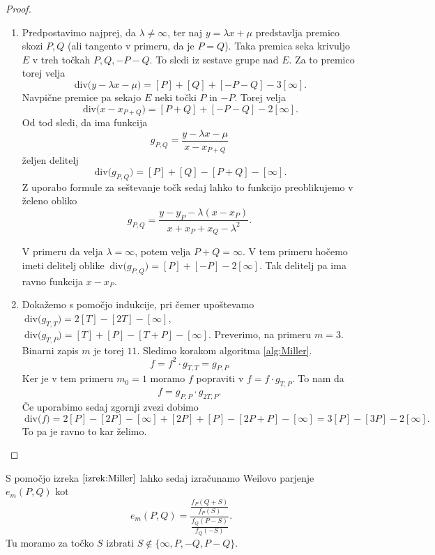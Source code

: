 \documentclass[12pt,a4paper,twoside]{article}
\theoremstyle{definition} %
\theoremstyle{plain} %
\numberwithin{equation}{section}  %
\newcommand{\Div}[1]{\ \text{div(}{#1}\text{)}}
\begin{document}
\begin{proof}~

\begin{enumerate}
\item Predpostavimo najprej, da $\lambda \neq \infty$, ter naj $y = \lambda x + \mu$ predstavlja premico skozi $P,Q$ (ali tangento v primeru, da je $P=Q$). Taka premica seka krivuljo $E$ v treh točkah $P,Q,-P-Q$. To sledi iz sestave grupe nad $E$. Za to premico torej velja
$$\Div{y-\lambda x - \mu} = [P] + [Q] + [-P-Q] - 3[\infty].$$
Navpične premice pa sekajo $E$ neki točki $P$ in $-P$. Torej velja
$$\Div{x-x_{P+Q}} = [P+Q] + [-P-Q] - 2[\infty].$$
Od tod sledi, da ima funkcija
$$g_{P,Q} =\frac{y-\lambda x - \mu}{x-x_{P+Q}}$$
željen delitelj
$$\Div{g_{P,Q}} = [P] + [Q] - [P+Q] - [\infty].$$
Z uporabo formule za seštevanje točk sedaj lahko to funkcijo preoblikujemo v želeno obliko
$$g_{P,Q} = \frac{y-y_P-\lambda(x-x_P)}{x+x_P+x_Q-\lambda^2} .$$

V primeru da velja $\lambda = \infty$, potem velja $P+Q = \infty$. V tem primeru hočemo imeti delitelj oblike $\Div{g_{P,Q}} = [P] + [-P] - 2[\infty]$. Tak delitelj pa ima ravno funkcija $x-x_P$.

\item Dokažemo s pomočjo indukcije, pri čemer upoštevamo $\Div{g_{T,T}} = 2[T]-[2T]-[\infty]$, $\Div{g_{T,P}} = [T]+[P]-[T+P]-[\infty]$.
Preverimo, na primeru $m = 3$. Binarni zapis $m$ je torej $11$. Sledimo korakom algoritma \ref{alg:Miller}.
$$f = f^2 \cdot g_{T,T} = g_{P,P}$$
Ker je v tem primeru $m_0 = 1$ moramo $f$ popraviti v $f = f \cdot g_{T,P}$. To nam da
$$f = g_{P,P} \cdot g_{2T,P}.$$
Če uporabimo sedaj zgornji zvezi dobimo
$$\Div{f} = 2[P] - [2P] - [\infty] + [2P] + [P] - [2P+P] - [\infty] = 3[P] - [3P]-2[\infty].$$
To pa je ravno to kar želimo.

\end{enumerate}

\end{proof}

S pomočjo izreka $\ref{izrek:Miller}$ lahko sedaj izračunamo Weilovo parjenje $e_m(P,Q)$ kot
$$e_m(P,Q) = \frac{\frac{f_P(Q+S)}{f_P(S)}}{\frac{f_Q(P-S)}{f_Q(-S)}} .$$
Tu moramo za točko $S$ izbrati $S \notin \{ \infty,P,-Q,P-Q\}$.
\end{document}
